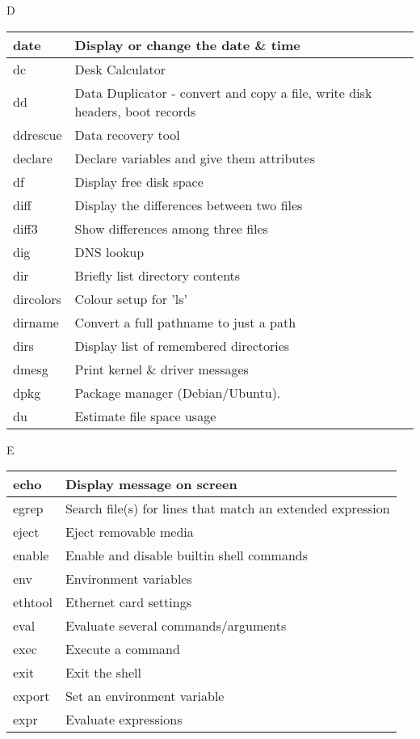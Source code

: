 \begin{flushleft}
\begin{tcolorbox}
	\textsc{D}
\end{tcolorbox}

\begin{tabular}{lp{12cm}}
	\hline
	date &	Display or change the date \& time \\
	\hline
	dc &	Desk Calculator \\
	\hline
	dd &	Data Duplicator - convert and copy a file, write disk headers, boot  records \\
	\hline
	ddrescue &	Data recovery tool \\
	\hline
	declare &	Declare variables and give them attributes \\
	\hline
	df &	Display free disk space \\
	\hline
	diff &	Display the differences between two files \\
	\hline
	diff3 &	Show differences among three files \\
	\hline
	dig &	DNS lookup \\
	\hline
	dir &	Briefly list directory contents \\
	\hline
	dircolors &	Colour setup for 'ls' \\
	\hline
	dirname &	Convert a full pathname to just a path \\
	\hline
	dirs &	Display list of remembered directories \\
	\hline
	dmesg &	Print kernel \& driver messages \\
	\hline
	dpkg &	Package manager (Debian/Ubuntu). \\
	\hline
	du &	Estimate file space usage \\
	\hline
\end{tabular}
\newpage


\begin{tcolorbox}
	\textsc{E}
\end{tcolorbox}

\begin{tabular}{lp{12cm}}
	\hline
	echo &	Display message on screen \\
	\hline
	egrep &	Search file(s) for lines that match an extended expression \\
	\hline
	eject &	Eject removable media \\
	\hline
	enable &	Enable and disable builtin shell commands \\
	\hline
	env &	Environment variables \\
	\hline
	ethtool &	Ethernet card settings \\
	\hline
	eval &	Evaluate several commands/arguments \\
	\hline
	exec &	Execute a command \\
	\hline
	exit &	Exit the shell \\
	\hline
	export &	Set an environment variable \\
	\hline
	expr &	Evaluate expressions \\
	\hline
\end{tabular}


\end{flushleft}
